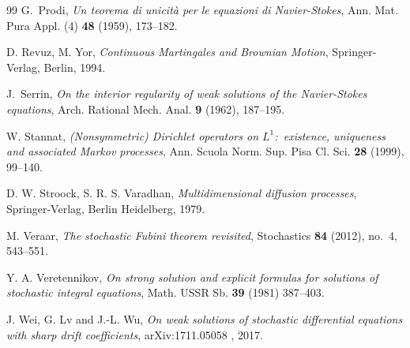 \documentclass[a4paper,10pt]{article}
\newcommand\1{\mathbbm{1}}
\numberwithin{equation}{section}
\begin{document}
\begin{thebibliography}{99}
G.~Prodi, \textit{Un teorema di unicit\`a per le equazioni di {N}avier-{S}tokes},
  Ann. Mat. Pura Appl. (4) \textbf{{\bf 48}} (1959), 173--182.

D. Revuz, M. Yor, \textit{Continuous Martingales and
Brownian Motion}, Springer-Verlag, Berlin, 1994.

J.~Serrin, \textit{On the interior regularity of weak solutions of the
  {N}avier-{S}tokes equations}, Arch. Rational Mech. Anal. \textbf{{\bf9}}
  (1962), 187--195.

W. Stannat, \textit{\textup{(}Nonsymmetric\textup{)} Dirichlet operators on $L^{1}$:\ existence, 
uniqueness and associated Markov processes}, Ann. Scuola Norm. Sup. Pisa Cl. Sci. \textbf{28} (1999), 99--140.

 D. W. Stroock, S. R. S. Varadhan, \textit{Multidimensional diffusion processes}, Springer-Verlag, Berlin Heidelberg, 1979.

M. Veraar, \textit{The stochastic Fubini theorem revisited}, Stochastics \textbf{84} (2012), no.~4, 543--551.

Y. A. Veretennikov, \textit{On strong solution and explicit formulas for solutions of stochastic integral equations}, Math. USSR Sb. \textbf{39} (1981) 387--403.

 J. Wei, G. Lv and J.-L. Wu, \textit{On weak solutions of stochastic differential equations with sharp drift coefficients}, arXiv:1711.05058 , 2017.

\end{thebibliography}
\end{document}
